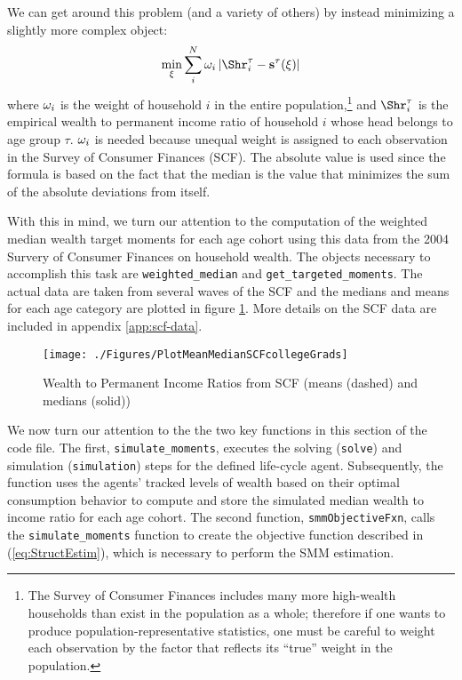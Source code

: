 \documentclass[titlepage, headings=optiontotocandhead]{Resources/texmf-local/tex/latex/econtex}
\begin{document}
We can get around this problem (and a variety of others) by instead minimizing a slightly more complex object:
  \begin{equation}
    \min_{\xi}\sum_{i}^{N}\weight _{i}\left|\Shr_{i}^{\tau }-\mathbf{s}^{\tau}(\xi )\right|\label{eq:StructEstim}
  \end{equation}
where $\omega_{i}$ is the weight of household $i$ in the entire
population,\footnote{The Survey of Consumer Finances includes many
  more high-wealth households than exist in the population as a whole;
  therefore if one wants to produce population-representative
  statistics, one must be careful to weight each observation by the
  factor that reflects its ``true'' weight in the population.} and
$\Shr_{i}^{\tau }$ is the empirical wealth to permanent income
ratio of household $i$ whose head belongs to age group
$\tau$. $\omega _{i}$ is needed because unequal weight is assigned to
each observation in the Survey of Consumer Finances (SCF). The
absolute value is used since the formula is based on the fact that the
median is the value that minimizes the sum of the absolute deviations
from itself.


With this in mind, we turn our attention to the computation
of the weighted median wealth target moments for each age cohort
using this data from the 2004 Survery of Consumer Finances on household
wealth. The objects necessary to accomplish this task are \texttt{weighted\_median} and
\texttt{get\_targeted\_moments}. The actual data are taken from several waves of the SCF and the medians
and means for each age category are plotted in figure \ref{fig:MeanMedianSCF}.
More details on the SCF data are included in appendix \ref{app:scf-data}.

\hypertarget{PlotMeanMedianSCFcollegeGrads}{}
\begin{figure}
  \texttt{[image: ./Figures/PlotMeanMedianSCFcollegeGrads]}
  \caption{Wealth to Permanent Income Ratios from SCF (means (dashed) and medians (solid))}
  \label{fig:MeanMedianSCF}
\end{figure}

We now turn our attention to the the two key functions in this section of the code file. The first, \texttt{simulate\_moments}, executes the solving (\texttt{solve}) and simulation (\texttt{simulation}) steps for the defined life-cycle agent.  Subsequently, the function uses the agents' tracked levels of wealth based on their optimal consumption behavior to compute and store the simulated median wealth to income ratio for each age cohort. The second function, \texttt{smmObjectiveFxn}, calls the \texttt{simulate\_moments} function to create the objective function described in (\ref{eq:StructEstim}), which is necessary to perform the SMM estimation.
\end{document}
